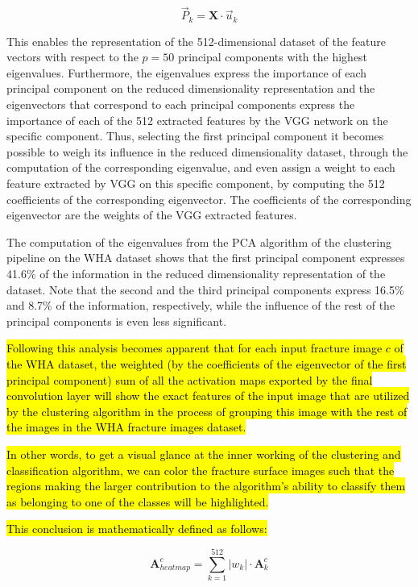 \documentclass[authoryear,preprint,review,12pt, singleside]{elsarticle}
\begin{document}
\begin{equation*}
\vec{P}_k = \textbf{X} \cdot \vec{u}_k
\end{equation*}

This enables the representation of the 512-dimensional dataset of the feature vectors with respect to the $p=50$ principal components with the highest eigenvalues. Furthermore, the eigenvalues express the importance of each principal component on the reduced dimensionality representation and the eigenvectors that correspond to each principal components express the importance of each of the 512 extracted features by the VGG network on the specific component. Thus, selecting the first principal component it becomes possible to weigh its influence in the reduced dimensionality dataset, through the computation of the corresponding eigenvalue, and even assign a weight to each feature extracted by VGG on this specific component, by computing the 512 coefficients of the corresponding eigenvector. The coefficients of the corresponding eigenvector are the weights of the VGG extracted features.

The computation of the eigenvalues from the PCA algorithm of the clustering pipeline on the WHA dataset shows that the first principal component expresses 41.6\% of the information in the reduced dimensionality representation of the dataset. Note that the second and the third principal components express 16.5\% and 8.7\% of the information, respectively, while the influence of the rest of the principal components is even less significant.  

\hl{Following this analysis becomes apparent that for each input fracture image $c$ of the WHA dataset, the weighted (by the coefficients of the eigenvector of the first principal component) sum of all the activation maps exported by the final convolution layer will show the exact features of the input image that are utilized by the clustering algorithm in the process of grouping this image with the rest of the images in the WHA fracture images dataset. }
	
\hl{In other words, to get a visual glance at the inner working of the clustering and classification algorithm, we can color the fracture surface images such that the regions making the larger contribution to the algorithm's ability to classify them as belonging to one of the classes will be highlighted. }
	
\hl{This conclusion is mathematically defined as follows:}

\begin{equation*}
\textbf{A}_{heatmap}^c = \sum_{k=1}^{512} |w_k| \cdot \textbf{A}^c_k 
\end{equation*}  
\end{document}
